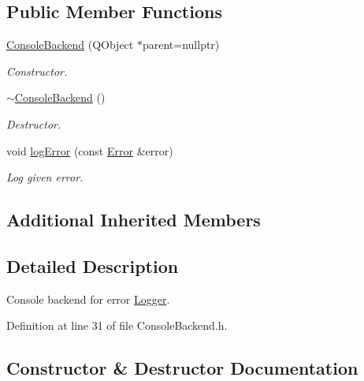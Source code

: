 \subsection*{Public Member Functions}
\begin{DoxyCompactItemize}
\item 
\hyperlink{class_mdt_1_1_error_logger_1_1_console_backend_a79446af5d7658fba5075131f2a0b10dd}{Console\+Backend} (Q\+Object $\ast$parent=nullptr)
\begin{DoxyCompactList}\small\item\em Constructor. \end{DoxyCompactList}\item 
\hyperlink{class_mdt_1_1_error_logger_1_1_console_backend_a7ac5878daa1e4204884d62c592de0e57}{$\sim$\+Console\+Backend} ()
\begin{DoxyCompactList}\small\item\em Destructor. \end{DoxyCompactList}\item 
void \hyperlink{class_mdt_1_1_error_logger_1_1_console_backend_a2d30700dd6a91c244d68bd3670fdbc33}{log\+Error} (const \hyperlink{class_mdt_1_1_error}{Error} \&error)
\begin{DoxyCompactList}\small\item\em Log given error. \end{DoxyCompactList}\end{DoxyCompactItemize}
\subsection*{Additional Inherited Members}


\subsection{Detailed Description}
Console backend for error \hyperlink{class_mdt_1_1_error_logger_1_1_logger}{Logger}. 

Definition at line 31 of file Console\+Backend.\+h.



\subsection{Constructor \& Destructor Documentation}
